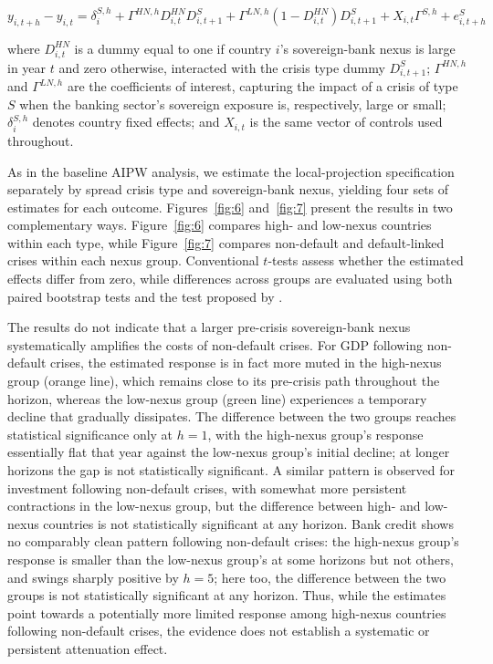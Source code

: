 \documentclass[12pt]{article}
\begin{document}
\begin{equation}
\label{eq:5}
y_{i,t+h} - y_{i,t} = \delta_i^{S,h}
  + \Gamma^{HN,h} D_{i,t}^{HN} D_{i,t+1}^{S}
  + \Gamma^{LN,h} \left(1 - D_{i,t}^{HN}\right) D_{i,t+1}^{S}
  + X_{i,t}\Gamma^{S,h} + e_{i,t+h}^{S}
\end{equation}

\noindent where $D_{i,t}^{HN}$ is a dummy equal to one if country $i$'s
sovereign-bank nexus is large in year $t$ and zero otherwise, interacted
with the crisis type dummy $D_{i,t+1}^S$; $\Gamma^{HN,h}$ and
$\Gamma^{LN,h}$ are the coefficients of interest, capturing the impact of
a crisis of type $S$ when the banking sector's sovereign exposure is,
respectively, large or small; $\delta_i^{S,h}$ denotes country fixed
effects; and $X_{i,t}$ is the same vector of controls used throughout.

As in the baseline AIPW analysis, we estimate the local-projection
specification separately by spread crisis type and sovereign-bank nexus,
yielding four sets of estimates for each outcome. Figures~\ref{fig:6}
and~\ref{fig:7} present the results in two complementary ways.
Figure~\ref{fig:6} compares high- and low-nexus countries within each
type, while Figure~\ref{fig:7} compares non-default and default-linked
crises within each nexus group. Conventional $t$-tests assess whether the
estimated effects differ from zero, while differences across groups are
evaluated using both paired bootstrap tests and the test proposed by
\citet{clogg1995statistical}.

The results do not indicate that a larger pre-crisis sovereign-bank nexus
systematically amplifies the costs of non-default crises. For GDP
following non-default crises, the estimated response is in fact more
muted in the high-nexus group (orange line), which remains close to its
pre-crisis path throughout the horizon, whereas the low-nexus group
(green line) experiences a temporary decline that gradually dissipates.
The difference between the two groups reaches statistical significance
only at $h=1$, with the high-nexus group's response essentially flat that
year against the low-nexus group's initial decline; at longer horizons the
gap is not statistically significant. A similar pattern is observed for
investment following non-default crises, with somewhat more persistent
contractions in the low-nexus group, but the difference between high- and
low-nexus countries is not statistically significant at any horizon.
Bank credit shows no comparably clean pattern following non-default
crises: the high-nexus group's response is smaller than the low-nexus
group's at some horizons but not others, and swings sharply positive by
$h=5$; here too, the difference between the two groups is not
statistically significant at any horizon. Thus, while the estimates point
towards a potentially more limited response among high-nexus countries
following non-default crises, the evidence does not establish a
systematic or persistent attenuation effect.
\end{document}
